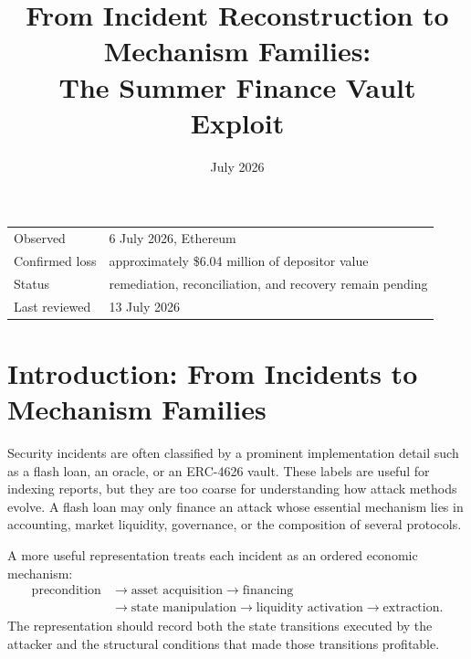 \documentclass[11pt]{article}
\title{From Incident Reconstruction to Mechanism Families:\\
The Summer Finance Vault Exploit}
\author{}
\date{July 2026}
\begin{document}
\maketitle

\begin{center}
\begin{tabular}{ll}
    Observed & 6 July 2026, Ethereum \\
    Confirmed loss & approximately \$6.04 million of depositor value \\
    Status & remediation, reconciliation, and recovery remain pending \\
    Last reviewed & 13 July 2026
\end{tabular}
\end{center}

\section{Introduction: From Incidents to Mechanism Families}

Security incidents are often classified by a prominent implementation detail such as a flash loan, an oracle, or an ERC-4626 vault.  These labels are useful for indexing reports, but they are too coarse for understanding how attack methods evolve.  A flash loan may only finance an attack whose essential mechanism lies in accounting, market liquidity, governance, or the composition of several protocols.

A more useful representation treats each incident as an ordered economic mechanism:
\begin{equation}
    \begin{aligned}
        \text{precondition}
        &\longrightarrow \text{asset acquisition}
        \longrightarrow \text{financing} \\
        &\longrightarrow \text{state manipulation}
        \longrightarrow \text{liquidity activation}
        \longrightarrow \text{extraction}.
    \end{aligned}
\end{equation}
The representation should record both the state transitions executed by the attacker and the structural conditions that made those transitions profitable.
\end{document}
